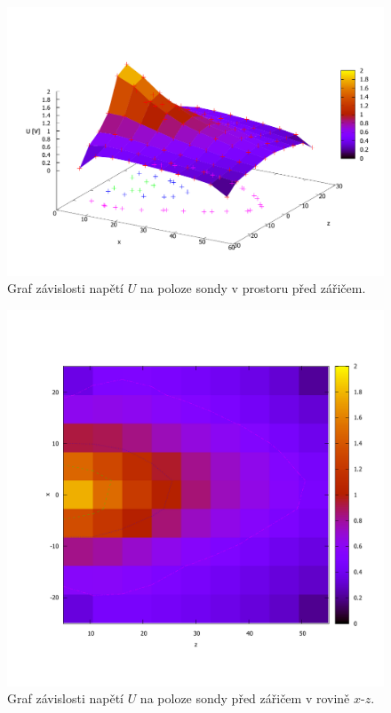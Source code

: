 \documentclass[english]{article}
\begin{document}
	\begin{figure}[h!]
	\begin{center}
	    \vspace*{-1cm}
		\includegraphics[width=\linewidth]{../gnuplot/2_mapping3d.pdf}
	    \vspace*{-2cm}
		\caption{Graf závislosti napětí $U$ na poloze sondy v prostoru před zářičem. }
		\label{fig:g_mapping_3d}
	\end{center}
	\end{figure}				

	\begin{figure}[h!]
	\begin{center}
	    \vspace*{-2cm}
		\includegraphics[width=0.7\linewidth]{../gnuplot/2_mapping3d_mapa.pdf}
	    \vspace*{-1cm}
		\caption{Graf závislosti napětí $U$ na poloze sondy před zářičem v rovině $x$-$z$. }
		\label{fig:g_mapping_3d_map}
	\end{center}
	\end{figure}	
	
\end{document}
